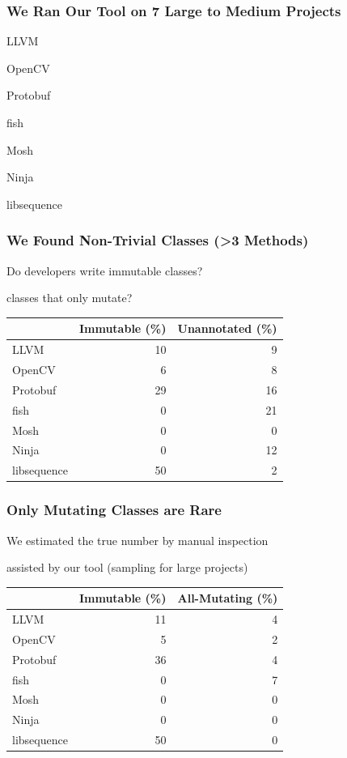 \documentclass[aspectratio=169]{beamer}
\begin{document}
  \begin{frame}
    \frametitle{We Ran Our Tool on 7 Large to Medium Projects}

    LLVM

    OpenCV

    Protobuf

    fish

    Mosh

    Ninja

    libsequence
  \end{frame}

  \begin{frame}
    \frametitle{We Found Non-Trivial Classes (>3 Methods)}

    Do developers write immutable classes?

    \hspace{1em} classes that only mutate?

    \vspace{2em}

    \begin{tabular}{l r r}
                  & Immutable (\%) & Unannotated (\%) \\
      \hline
      LLVM        & 10 &  9 \\
      OpenCV      &  6 &  8 \\
      Protobuf    & 29 & 16 \\
      fish        &  0 & 21 \\
      Mosh        &  0 &  0 \\
      Ninja       &  0 & 12 \\
      libsequence & 50 &  2 \\
    \end{tabular}
  \end{frame}

  \begin{frame}
    \frametitle{Only Mutating Classes are Rare}

    We estimated the true number by manual inspection

    \hspace{1em} assisted by our tool (sampling for large projects)

    \vspace{2em}

    \begin{tabular}{l r r}
                  & Immutable (\%) & All-Mutating (\%) \\
      \hline
      LLVM        & 11 & 4 \\
      OpenCV      &  5 & 2 \\
      Protobuf    & 36 & 4 \\
      fish        &  0 & 7 \\
      Mosh        &  0 & 0 \\
      Ninja       &  0 & 0 \\
      libsequence & 50 & 0 \\
    \end{tabular}
  \end{frame}
\end{document}
